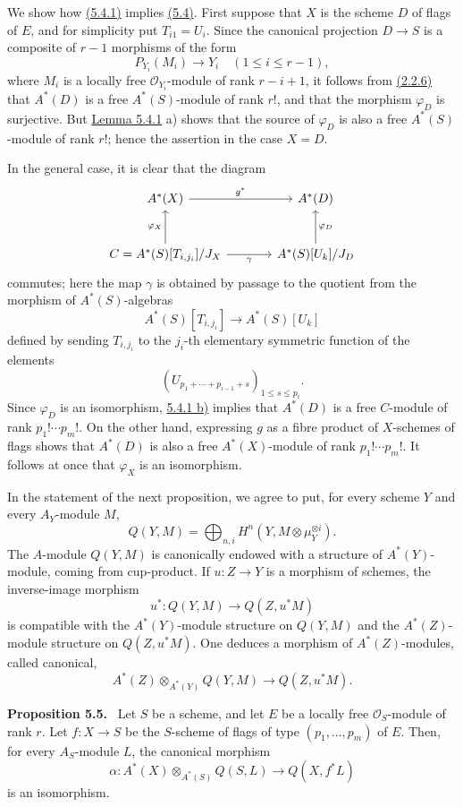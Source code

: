 \documentclass[11pt]{article}
\newenvironment{statement}[1]{\par\medskip\noindent\textbf{#1.}\ }{\par\medskip}
\begin{document}
We show how \hyperref[sga5:VII:lemma:5.4.1]{(5.4.1)} implies \hyperref[sga5:VII:proposition:5.4]{(5.4)}. First suppose that $X$ is the scheme $D$ of flags of $E$, and for simplicity put $T_{i1}=U_i$. Since the canonical projection $D\to S$ is a composite of $r-1$ morphisms of the form
\[
P_{Y_i}(M_i)\to Y_i\quad(1\le i\le r-1),
\]
where $M_i$ is a locally free $\mathcal O_{Y_i}$-module of rank $r-i+1$, it follows from \hyperref[sga5:VII:corollary:2.2.6]{(2.2.6)} that $A^*(D)$ is a free $A^*(S)$-module of rank $r!$, and that the morphism $\varphi_D$ is surjective. But \hyperref[sga5:VII:lemma:5.4.1]{Lemma 5.4.1} a) shows that the source of $\varphi_D$ is also a free $A^*(S)$-module of rank $r!$; hence the assertion in the case $X=D$.

In the general case, it is clear that the diagram
\[
\begin{tikzcd}[column sep=large,row sep=large]
A^*(X) \arrow[r,"g^*"] & A^*(D)\\
C=A^*(S)[T_{i,j_i}]/J_X \arrow[u,"\varphi_X"] \arrow[r,"\gamma"'] &
A^*(S)[U_k]/J_D \arrow[u,"\varphi_D"']
\end{tikzcd}
\]
commutes; here the map $\gamma$ is obtained by passage to the quotient from the morphism of $A^*(S)$-algebras
\[
A^*(S)[T_{i,j_i}]\to A^*(S)[U_k]
\]
defined by sending $T_{i,j_i}$ to the $j_i$-th elementary symmetric function of the elements
\[
(U_{p_1+\cdots+p_{i-1}+s})_{1\le s\le p_i}.
\]
Since $\varphi_D$ is an isomorphism, \hyperref[sga5:VII:lemma:5.4.1]{5.4.1 b)} implies that $A^*(D)$ is a free $C$-module of rank $p_1!\cdots p_m!$. On the other hand, expressing $g$ as a fibre product of $X$-schemes of flags shows that $A^*(D)$ is also a free $A^*(X)$-module of rank $p_1!\cdots p_m!$. It follows at once that $\varphi_X$ is an isomorphism.

In the statement of the next proposition, we agree to put, for every scheme $Y$ and every $A_Y$-module $M$,
\[
Q(Y,M)=\bigoplus_{n,i}H^n(Y,M\otimes\mu_Y^{\otimes i}).
\]
The $A$-module $Q(Y,M)$ is canonically endowed with a structure of $A^*(Y)$-module, coming from cup-product. If $u:Z\to Y$ is a morphism of schemes, the inverse-image morphism
\[
u^*:Q(Y,M)\to Q(Z,u^*M)
\]
is compatible with the $A^*(Y)$-module structure on $Q(Y,M)$ and the $A^*(Z)$-module structure on $Q(Z,u^*M)$. One deduces a morphism of $A^*(Z)$-modules, called canonical,
\[
A^*(Z)\otimes_{A^*(Y)}Q(Y,M)\to Q(Z,u^*M).
\]

\label{sga5:VII:proposition:5.5}\begin{statement}{Proposition 5.5}
Let $S$ be a scheme, and let $E$ be a locally free $\mathcal O_S$-module of rank $r$. Let $f:X\to S$ be the $S$-scheme of flags of type $(p_1,\ldots,p_m)$ of $E$. Then, for every $A_S$-module $L$, the canonical morphism
\[
\alpha:A^*(X)\otimes_{A^*(S)}Q(S,L)\to Q(X,f^*L)
\]
is an isomorphism.
\end{statement}
\end{document}
